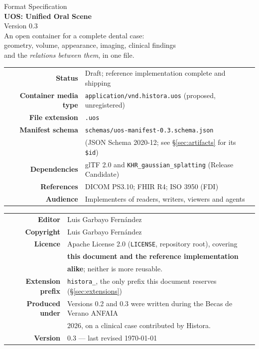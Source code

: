 \documentclass[11pt,a4paper]{article}
\newcommand{\uosver}{0.3}
\newcommand{\code}[1]{\texttt{\small #1}}
\begin{document}
\begin{titlepage}
\centering
\vspace*{2.5cm}
{\color{uosgrey}\large Format Specification}\\[0.6cm]
{\color{uosblack}\Huge\bfseries UOS: Unified Oral Scene}\\[0.5cm]
{\color{uosblack}\LARGE Version \uosver}\\[1.4cm]
{\large An open container for a complete dental case:\\
geometry, volume, appearance, imaging, clinical findings\\
and the \emph{relations between them}, in one file.}\\[2.2cm]

\begin{tabular}{@{}rl@{}}
\textbf{Status} & Draft; reference implementation complete and shipping\\
\textbf{Container media type} & \code{application/vnd.histora.uos} (proposed, unregistered)\\
\textbf{File extension} & \code{.uos}\\
\textbf{Manifest schema} & \code{schemas/uos-manifest-0.3.schema.json}\\
 & (JSON Schema 2020-12; see \S\ref{sec:artifacts} for its \code{\$id})\\
\textbf{Dependencies} & glTF 2.0 and \code{KHR\_gaussian\_splatting} (Release Candidate)\\
\textbf{References} & DICOM PS3.10; FHIR R4; ISO 3950 (FDI)\\
\textbf{Audience} & Implementers of readers, writers, viewers and agents\\
\end{tabular}

\vspace{1.0cm}

\begin{tabular}{@{}rl@{}}
\textbf{Editor} & Luis Garbayo Fern\'andez\\
\textbf{Copyright} & Luis Garbayo Fern\'andez\\
\textbf{Licence} & Apache License 2.0 (\code{LICENSE}, repository root), covering\\
 & \textbf{this document and the reference implementation}\\
 & \textbf{alike}; neither is more reusable.\\
\textbf{Extension prefix} & \code{histora\_}, the only prefix this document reserves (\S\ref{sec:extensions})\\
\textbf{Produced under} & Versions 0.2 and 0.3 were written during the Becas de Verano ANFAIA\\
 & 2026, on a clinical case contributed by Histora.\\
\textbf{Version} & \uosver{} --- last revised \today\\
\end{tabular}


\end{titlepage}
\end{document}
